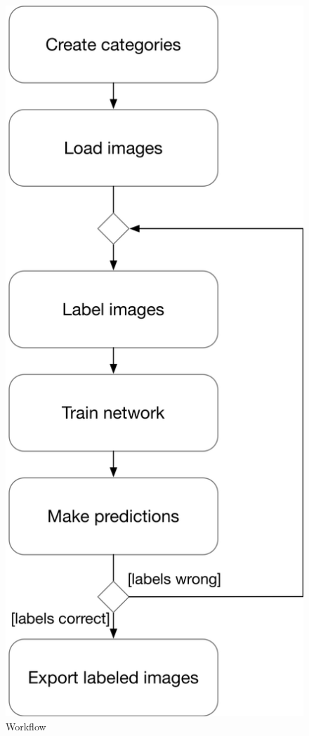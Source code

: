 \begin{figure}[H]
	\centering
	
\includegraphics[scale=0.6]{bilder/cyto/Ablaufdiagramm.png}
	\caption{Workflow}
	\label{fig:Workflow}
\end{figure}

